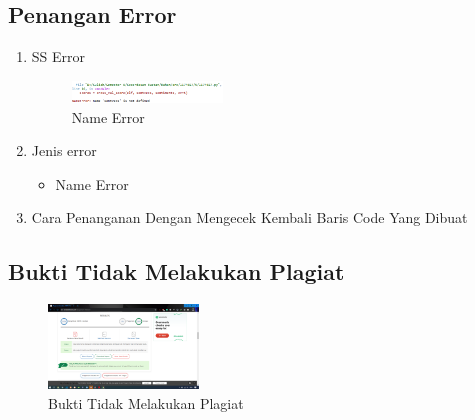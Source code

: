 \subsection{Penangan Error}
\begin{enumerate}
	\item SS Error
	\hfill\break
		\begin{figure}[H]
			\includegraphics[width=4cm]{figures/1174027/error/5_name_error.png}
			\centering
			\caption{Name Error}
		\end{figure}
	\item Jenis error
	\begin{itemize}
		\item Name Error
	\end{itemize}
	\item Cara Penanganan
	\hfill\break
	Dengan Mengecek Kembali Baris Code Yang Dibuat
\end{enumerate}
\subsection{Bukti Tidak Melakukan Plagiat}
\hfill\break
\begin{figure}[H]
	\includegraphics[width=4cm]{figures/1174027/bukti/5.png}
	\centering
	\caption{Bukti Tidak Melakukan Plagiat}
\end{figure}